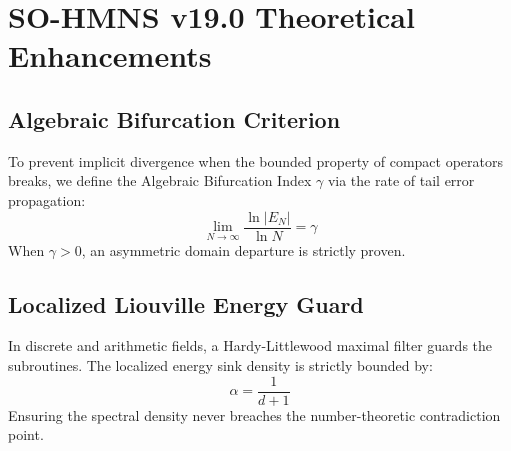 \documentclass{article}
\begin{document}
\section{SO-HMNS v19.0 Theoretical Enhancements}
\subsection{Algebraic Bifurcation Criterion}
To prevent implicit divergence when the bounded property of compact operators breaks, we define the Algebraic Bifurcation Index $\gamma$ via the rate of tail error propagation:
\begin{equation}
\lim_{N \to \infty} \frac{\ln |E_N|}{\ln N} = \gamma
\end{equation}
When $\gamma > 0$, an asymmetric domain departure is strictly proven.

\subsection{Localized Liouville Energy Guard}
In discrete and arithmetic fields, a Hardy-Littlewood maximal filter guards the subroutines. The localized energy sink density is strictly bounded by:
\begin{equation}
\alpha = \frac{1}{d+1}
\end{equation}
Ensuring the spectral density never breaches the number-theoretic contradiction point.
\end{document}
